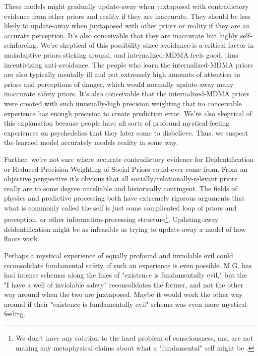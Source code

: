 \documentclass[12pt,letterpaper]{book}
\begin{document}
These models might gradually update-away when juxtaposed with contradictory evidence from other priors and reality if they are inaccurate. They should be less likely to update-away when juxtaposed with other priors or reality if they are an accurate perception. It's also conceivable that they are inaccurate but highly self-reinforcing. We're skeptical of this possibility since avoidance is a critical factor in maladaptive priors sticking around, and internalized-MDMA feels good, thus incentivizing anti-avoidance. The people who learn the internalized-MDMA priors are also typically mentally ill and put extremely high amounts of attention to priors and perceptions of danger, which would normally update-away many inaccurate safety priors. It's also conceivable that the internalized-MDMA priors were created with such unusually-high precision weighting that no conceivable experience has enough precision to create prediction error. We're also skeptical of this explanation because people have all sorts of profound mystical-feeling experiences on psychedelics that they later come to disbelieve. Thus, we suspect the learned model accurately models reality in some way.

Further, we're not sure where accurate contradictory evidence for Deidentification or Reduced Precision-Weighting of Social Priors could ever come from. From an objective perspective it's obvious that all socially/relationally-relevant priors really are to some degree unreliable and historically contingent. The fields of physics and predictive processing both have extremely rigorous arguments that what is commonly called the self is just some complicated loop of priors and perception, or other information-processing structure\footnote{We don't have any solution to the hard problem of consciousness, and are not making any metaphysical claims about what a "fundamental" self might be \cite{hardProblem}.}. Updating-away deidentification might be as infeasible as trying to update-away a model of how floors work.

Perhaps a mystical experience of equally profound and inviolable evil could reconsolidate fundamental safety, if such an experience is even possible. M.G. has had intense schemas along the lines of "existence is fundamentally evil," but the "I have a well of inviolable safety" reconsolidates the former, and not the other way around when the two are juxtaposed. Maybe it would work the other way around if their "existence is fundamentally evil" schema was even more mystical-feeling.
\end{document}
